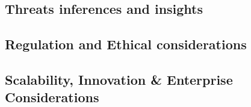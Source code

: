 \documentclass{article}
\begin{document}
\subsection{Threats inferences and insights}
\subsection{Regulation and Ethical considerations}
\subsection{Scalability, Innovation \& Enterprise Considerations}

\vfill\pagebreak


% 
\end{document}
